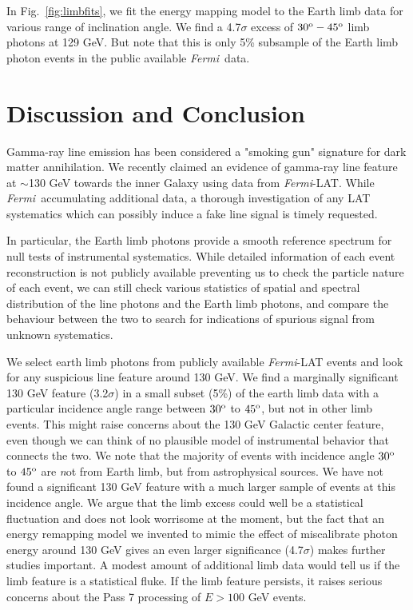 \documentclass[aps,twocolumn,prd,superscriptaddress,showpacs,nofootinbib,fixfloat]{revtex4}
\newcommand{\Fermi}{{\slshape Fermi}}
\newcommand{\degree}{^{\rm o}}
\begin{document}
In Fig.~\ref{fig:limbfits}, we fit the energy mapping model
to the Earth limb data for various range of inclination
angle. We find a 4.7$\sigma$ excess of $30\degree-45\degree$
limb photons at 129 GeV. But note that this is only 5\% subsample of the Earth limb photon events in the public available \Fermi\ data.


\section{Discussion and Conclusion}
\label{sec:Conclusion}

Gamma-ray line emission has been considered a "smoking gun"
signature for dark matter annihilation.  We recently claimed
an evidence of gamma-ray line feature at $\sim$130 GeV
towards the inner Galaxy using data from \Fermi-LAT. While
\Fermi\ accumulating additional data, a thorough
investigation of any LAT systematics which can possibly
induce a fake line signal is timely requested.

In particular, the Earth limb photons provide a smooth
reference spectrum for null tests of instrumental
systematics. While detailed information of each event
reconstruction is not publicly available preventing us to
check the particle nature of each event, we can still check
various statistics of spatial and spectral distribution of
the line photons and the Earth limb photons, and compare the
behaviour between the two to search for indications of
spurious signal from unknown systematics.

We select earth limb photons from publicly available
\Fermi-LAT events and look for any suspicious line feature
around 130 GeV.  We find a marginally significant 130 GeV
feature (3.2$\sigma$) in a small subset (5\%) of the earth
limb data with a particular incidence angle range between
$30\degree$ to $45\degree$, but not in other limb events.  This
might raise concerns about the 130 GeV Galactic center
feature, even though we can think of no plausible model of
instrumental behavior that connects the two.  We note that
the majority of events with incidence angle $30\degree$ to
$45\degree$ are {\emph not} from Earth limb, but from
astrophysical sources. We have not found a significant 130 GeV
feature with a much larger sample of events at this incidence
angle.
We argue that the limb excess could well be a statistical
fluctuation and does not look worrisome at the moment, but
the fact that an energy remapping model we invented to mimic
the effect of miscalibrate photon energy around 130 GeV
gives an even larger significance (4.7$\sigma$) makes
further studies important. A modest amount of additional
limb data would tell us if the limb feature is a statistical
fluke.  If the limb feature persists, it raises serious
concerns about the Pass 7 processing of $E > 100$ GeV
events.
\end{document}
